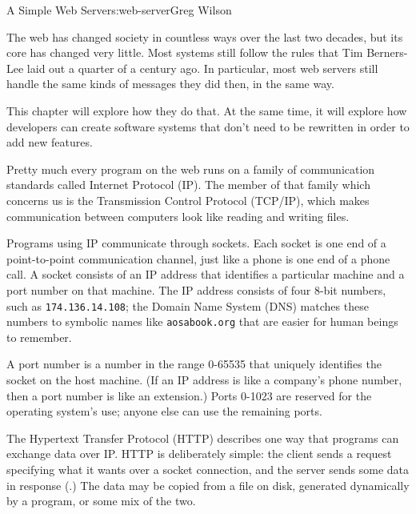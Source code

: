 \begin{aosachapter}{A Simple Web Server}{s:web-server}{Greg Wilson}

\label{introduction}

The web has changed society in countless ways over the last two decades,
but its core has changed very little. Most systems still follow the
rules that Tim Berners-Lee laid out a quarter of a century ago. In
particular, most web servers still handle the same kinds of messages
they did then, in the same way.

This chapter will explore how they do that. At the same time, it will
explore how developers can create software systems that don't need to be
rewritten in order to add new features.

\label{background}

Pretty much every program on the web runs on a family of communication
standards called Internet Protocol (IP). The member of that family which
concerns us is the Transmission Control Protocol (TCP/IP), which makes
communication between computers look like reading and writing files.

Programs using IP communicate through sockets. Each socket is one end of
a point-to-point communication channel, just like a phone is one end of
a phone call. A socket consists of an IP address that identifies a
particular machine and a port number on that machine. The IP address
consists of four 8-bit numbers, such as \texttt{174.136.14.108}; the
Domain Name System (DNS) matches these numbers to symbolic names like
\texttt{aosabook.org} that are easier for human beings to remember.

A port number is a number in the range 0-65535 that uniquely identifies
the socket on the host machine. (If an IP address is like a company's
phone number, then a port number is like an extension.) Ports 0-1023 are
reserved for the operating system's use; anyone else can use the
remaining ports.

The Hypertext Transfer Protocol (HTTP) describes one way that programs
can exchange data over IP. HTTP is deliberately simple: the client sends
a request specifying what it wants over a socket connection, and the
server sends some data in response (.)
The data may be copied from a file on disk, generated dynamically by a
program, or some mix of the two.



\end{aosachapter}
